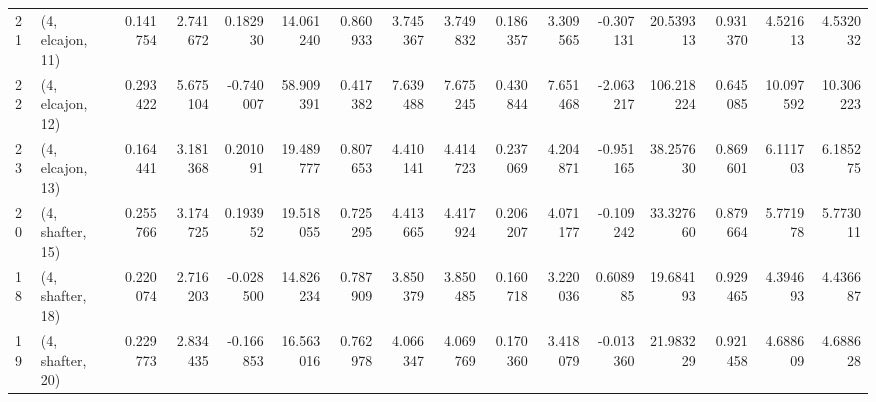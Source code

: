 \begin{tabular}{llrrrrrrrrrrrrrr}
21 &  (4, elcajon, 11) &   0.141754 &  2.741672 &  0.182930 &  14.061240 &  0.860933 &   3.745367 &  3.749832 &  0.186357 &   3.309565 & -0.307131 &   20.539313 &  0.931370 &   4.521613 &   4.532032 \\
22 &  (4, elcajon, 12) &   0.293422 &  5.675104 & -0.740007 &  58.909391 &  0.417382 &   7.639488 &  7.675245 &  0.430844 &   7.651468 & -2.063217 &  106.218224 &  0.645085 &  10.097592 &  10.306223 \\
23 &  (4, elcajon, 13) &   0.164441 &  3.181368 &  0.201091 &  19.489777 &  0.807653 &   4.410141 &  4.414723 &  0.237069 &   4.204871 & -0.951165 &   38.257630 &  0.869601 &   6.111703 &   6.185275 \\
20 &  (4, shafter, 15) &   0.255766 &  3.174725 &  0.193952 &  19.518055 &  0.725295 &   4.413665 &  4.417924 &  0.206207 &   4.071177 & -0.109242 &   33.327660 &  0.879664 &   5.771978 &   5.773011 \\
18 &  (4, shafter, 18) &   0.220074 &  2.716203 & -0.028500 &  14.826234 &  0.787909 &   3.850379 &  3.850485 &  0.160718 &   3.220036 &  0.608985 &   19.684193 &  0.929465 &   4.394693 &   4.436687 \\
19 &  (4, shafter, 20) &   0.229773 &  2.834435 & -0.166853 &  16.563016 &  0.762978 &   4.066347 &  4.069769 &  0.170360 &   3.418079 & -0.013360 &   21.983229 &  0.921458 &   4.688609 &   4.688628 \\
\bottomrule
\end{tabular}
